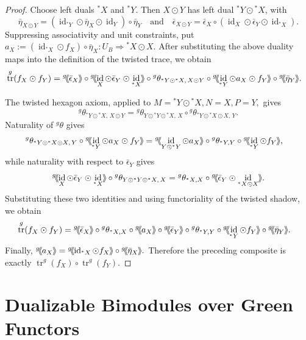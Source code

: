 \documentclass[11pt,oneside]{amsart}
\DeclareMathOperator{\tr}{tr}
\DeclareMathOperator{\id}{id}
\numberwithin{equation}{section}
\numberwithin{figure}{section}
\theoremstyle{plain}
\theoremstyle{definition}
\theoremstyle{remark}
\newcommand{\shspace}{\hspace{.5mm}} %
\newcommand{\sh}[1]{{\ensuremath{\shspace\hspace{1mm}\makebox[-1mm]{$\langle$}\makebox[0mm]{$\langle$}\hspace{1mm}{#1}\makebox[1mm]{$\rangle$}\makebox[0mm]{$\rangle$}\shspace}}}
\begin{document}
\begin{proof}
Choose left duals \({}^*X\) and \({}^*Y\).  Then \(X\odot Y\)
has left dual \({}^*Y\odot{}^*X\), with
\[
\bar\eta_{X\odot Y}
=
(\id_{{}^*Y}\odot\bar\eta_X\odot\id_Y)
\circ\bar\eta_Y
\quad \text{and} \quad
\bar\epsilon_{X\odot Y}
=
\bar\epsilon_X\circ
(\id_X\odot\bar\epsilon_Y\odot\id_{{}^*X}).
\]
Suppressing associativity and unit constraints, put
\(
a_X
:=
(\id_{{}^*X}\odot f_X)\circ\bar\eta_X
\colon
U_B\Rightarrow{}^*X\odot X.
\)
After substituting the above duality maps into the definition of the
twisted trace, we obtain
\begin{align*}
\tr^g(f_X\odot f_Y)
={}&
{}^g\!\sh{\bar\epsilon_X}
\circ
{}^g\!\sh{\id_X\odot\bar\epsilon_Y\odot\id_{{}^*X}}
\circ
{}^g\theta_{{}^*Y\odot{}^*X,\,X\odot Y}
\circ
{}^g\!\sh{\id_{{}^*Y}\odot a_X\odot f_Y}
\circ
{}^g\!\sh{\bar\eta_Y}.
\end{align*}

The twisted hexagon axiom, applied to
\(
M={}^*Y\odot{}^*X, N=X, P=Y,
\)
gives
\[
{}^g\theta_{{}^*Y\odot{}^*X,\,X\odot Y}
=
{}^g\theta_{Y\odot{}^*Y\odot{}^*X,\,X}
\circ
{}^g\theta_{{}^*Y\odot{}^*X\odot X,\,Y}.
\]
Naturality of \({}^g\theta\) gives
\begin{align*}
&{}^g\theta_{{}^*Y\odot{}^*X\odot X,\,Y}
\circ
{}^g\!\sh{\id_{{}^*Y}\odot a_X\odot f_Y}
  =
{}^g\!\sh{\id_{Y\odot{}^*Y}\odot a_X}
\circ
{}^g\theta_{{}^*Y,Y}
\circ
{}^g\!\sh{\id_{{}^*Y}\odot f_Y},
\end{align*}
while naturality with respect to \(\bar\epsilon_Y\) gives
\[
{}^g\!\sh{\id_X\odot\bar\epsilon_Y\odot\id_{{}^*X}}
\circ
{}^g\theta_{Y\odot{}^*Y\odot{}^*X,\,X}
=
{}^g\theta_{{}^*X,X}
\circ
{}^g\!\sh{\bar\epsilon_Y\odot
\id_{{}^*X\odot X}}.
\]
Substituting these two identities and using functoriality of the
twisted shadow, we obtain
\begin{align*}
\tr^g(f_X\odot f_Y)
={}&
{}^g\!\sh{\bar\epsilon_X}
\circ
{}^g\theta_{{}^*X,X}
\circ
{}^g\!\sh{a_X}
\circ
{}^g\!\sh{\bar\epsilon_Y}
\circ
{}^g\theta_{{}^*Y,Y}
\circ
{}^g\!\sh{\id_{{}^*Y}\odot f_Y}
\circ
{}^g\!\sh{\bar\eta_Y}.
\end{align*}
Finally,
\(
{}^g\!\sh{a_X}
=
{}^g\!\sh{\id_{{}^*X}\odot f_X}
\circ
{}^g\!\sh{\bar\eta_X}.
\)
Therefore the preceding composite is exactly
\(
\tr^g(f_X)\circ\tr^g(f_Y).
\)
\end{proof}
\appendix

\section{Dualizable Bimodules over Green Functors}
\label{sec:appendix}
\end{document}
